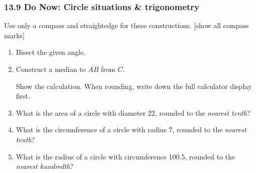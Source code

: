 \documentclass[12pt, twoside]{article}
\begin{document}
\subsubsection*{13.9 Do Now: Circle situations \& trigonometry}
Use only a compass and straightedge for these constructions. [show all compass marks]
  \begin{enumerate}

  \item Bisect the given angle. \vspace{1cm}
    \begin{center}
  \end{center} \vspace{0.5cm}

  \item Construct a median to $\overline{AB}$ from $C$.\\
    \vspace{3cm}
    \begin{center}
  \end{center}

\newpage
Show the calculation. When rounding, write down the full calculator display first.
   \item What is the area of a circle with diameter 22, rounded to the \emph{nearest tenth}? \vspace{2.5cm}
   \item What is the circumference of a circle with radius 7, rounded to the \emph{nearest tenth}? \vspace{2.5cm}
   \item What is the radius of a circle with circumference 100.5, rounded to the \emph{nearest hundredth}? \vspace{4cm}


\end{enumerate}
\end{document}
